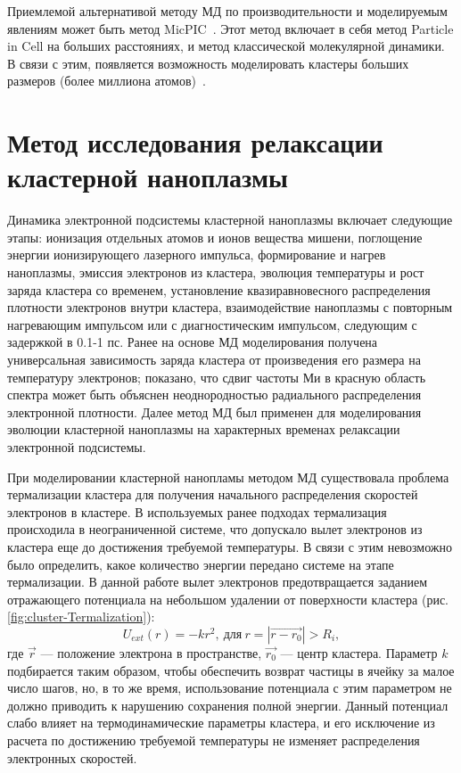 Приемлемой альтернативой методу МД  по производительности и моделируемым явлениям может быть метод MicPIC~\cite{Fennel-PRL12}. Этот метод включает в себя метод Particle in Cell на больших расстояниях, и метод классической молекулярной динамики. В связи с этим, появляется возможность моделировать кластеры больших размеров (более миллиона атомов)~\cite{Broda_CPP13,Gildenburg-PP2011}.

\section{Метод исследования релаксации кластерной наноплазмы}\label{sec:cluster-termalization}
Динамика электронной подсистемы кластерной наноплазмы включает следующие этапы: ионизация отдельных атомов и ионов вещества мишени, поглощение энергии ионизирующего
лазерного импульса, формирование и нагрев наноплазмы, эмиссия электронов из кластера,  эволюция температуры и рост заряда кластера со временем, установление квазиравновесного распределения плотности электронов внутри кластера, взаимодействие наноплазмы с повторным нагревающим импульсом или с диагностическим импульсом, следующим с задержкой в 0.1-1 пс. Ранее на основе МД моделирования получена универсальная зависимость заряда кластера от произведения его размера на температуру электронов; показано, что сдвиг частоты Ми в красную область спектра может быть объяснен неоднородностью радиального распределения электронной плотности.
Далее метод МД был применен для моделирования эволюции кластерной наноплазмы на характерных временах релаксации электронной подсистемы.

При моделировании кластерной нанопламы методом МД существовала проблема термализации кластера для получения начального распределения скоростей электронов в кластере. В используемых ранее подходах  термализация происходила в неограниченной системе, что допускало вылет электронов из кластера еще до достижения требуемой температуры. В связи с этим невозможно было определить, какое количество энергии передано системе на этапе термализации. В данной работе вылет электронов предотвращается заданием отражающего потенциала на небольшом удалении от поверхности кластера (рис. \ref{fig:cluster-Termalization}):
\begin{equation}
	U_{ext}(r)=-kr^2,~\text{для}~r = |\vec{r - r_0}| > R_i,
\end{equation}
где $\vec{r}$ --- положение электрона в пространстве, $\vec{r_0}$ --- центр кластера.
Параметр $k$ подбирается таким образом, чтобы обеспечить возврат частицы в ячейку за малое число шагов, но, в то же время, использование потенциала с этим параметром не должно приводить к нарушению сохранения полной энергии. Данный потенциал слабо влияет на термодинамические параметры кластера, и его исключение из расчета по достижению требуемой температуры не изменяет распределения электронных скоростей.


